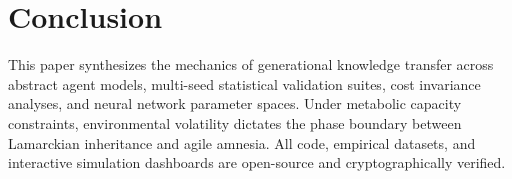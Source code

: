 \documentclass[11pt,a4paper]{article}
\begin{document}
\section{Conclusion}
This paper synthesizes the mechanics of generational knowledge transfer across abstract agent models, multi-seed statistical validation suites, cost invariance analyses, and neural network parameter spaces. Under metabolic capacity constraints, environmental volatility dictates the phase boundary between Lamarckian inheritance and agile amnesia. All code, empirical datasets, and interactive simulation dashboards are open-source and cryptographically verified.
\end{document}
